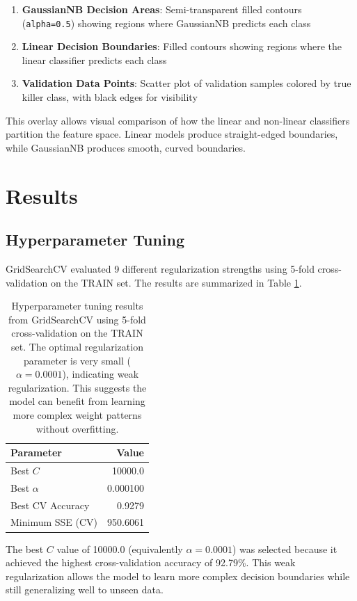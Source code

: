 \documentclass[12pt]{article}
\begin{document}
\begin{enumerate}
    \item \textbf{GaussianNB Decision Areas}: Semi-transparent filled contours (\texttt{alpha=0.5}) showing regions where GaussianNB predicts each class
    \item \textbf{Linear Decision Boundaries}: Filled contours showing regions where the linear classifier predicts each class
    \item \textbf{Validation Data Points}: Scatter plot of validation samples colored by true killer class, with black edges for visibility
\end{enumerate}

This overlay allows visual comparison of how the linear and non-linear classifiers partition the feature space. Linear models produce straight-edged boundaries, while GaussianNB produces smooth, curved boundaries.

\section{Results}

\subsection{Hyperparameter Tuning}

GridSearchCV evaluated 9 different regularization strengths using 5-fold cross-validation on the TRAIN set. The results are summarized in Table \ref{tab:hp_tuning}.

\begin{table}[h]
\centering
\begin{tabular}{lr}
\toprule
\textbf{Parameter} & \textbf{Value} \\
\midrule
Best $C$ & 10000.0 \\
Best $\alpha$ & 0.000100 \\
Best CV Accuracy & 0.9279 \\
Minimum SSE (CV) & 950.6061 \\
\bottomrule
\end{tabular}
\caption{Hyperparameter tuning results from GridSearchCV using 5-fold cross-validation on the TRAIN set. The optimal regularization parameter is very small ($\alpha = 0.0001$), indicating weak regularization. This suggests the model can benefit from learning more complex weight patterns without overfitting.}
\label{tab:hp_tuning}
\end{table}

The best $C$ value of 10000.0 (equivalently $\alpha = 0.0001$) was selected because it achieved the highest cross-validation accuracy of 92.79\%. This weak regularization allows the model to learn more complex decision boundaries while still generalizing well to unseen data.
\end{document}
